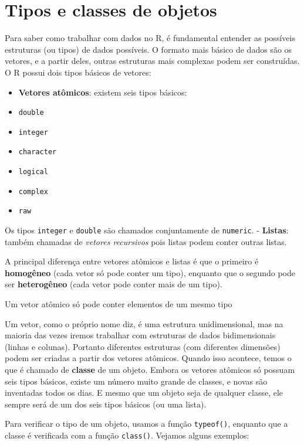 \documentclass[10pt,a4paper]{book}
\providecommand{\tightlist}{%
  \setlength{\itemsep}{0pt}\setlength{\parskip}{0pt}}
\begin{document}
\section{Tipos e classes de objetos}\label{tipos-e-classes-de-objetos}

Para saber como trabalhar com dados no R, é fundamental entender as
possíveis estruturas (ou tipos) de dados possíveis. O formato mais
básico de dados são os vetores, e a partir deles, outras estruturas mais
complexas podem ser construídas. O R possui dois tipos básicos de
vetores:

\begin{itemize}
\tightlist
\item
  \textbf{Vetores atômicos}: existem seis tipos básicos:
\item
  \texttt{double}
\item
  \texttt{integer}
\item
  \texttt{character}
\item
  \texttt{logical}
\item
  \texttt{complex}
\item
  \texttt{raw}
\end{itemize}

Os tipos \texttt{integer} e \texttt{double} são chamados conjuntamente
de \texttt{numeric}. - \textbf{Listas}: também chamadas de \emph{vetores
recursivos} pois listas podem conter outras listas.

A principal diferença entre vetores atômicos e listas é que o primeiro é
\textbf{homogêneo} (cada vetor só pode conter um tipo), enquanto que o
segundo pode ser \textbf{heterogêneo} (cada vetor pode conter mais de um
tipo).

Um vetor atômico só pode conter elementos de um mesmo tipo

Um vetor, como o próprio nome diz, é uma estrutura unidimensional, mas
na maioria das vezes iremos trabalhar com estruturas de dados
bidimensionais (linhas e colunas). Portanto diferentes estruturas (com
diferentes dimensões) podem ser criadas a partir dos vetores atômicos.
Quando isso acontece, temos o que é chamado de \textbf{classe} de um
objeto. Embora os vetores atômicos só possuam seis tipos básicos, existe
um número muito grande de classes, e novas são inventadas todos os dias.
E mesmo que um objeto seja de qualquer classe, ele sempre será de um dos
seis tipos básicos (ou uma lista).

Para verificar o tipo de um objeto, usamos a função \texttt{typeof()},
enquanto que a classe é verificada com a função \texttt{class()}.
Vejamos alguns exemplos:
\end{document}

